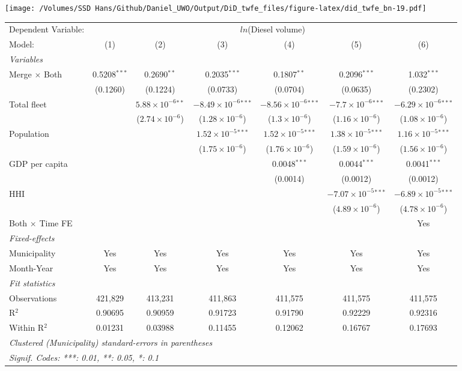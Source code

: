\documentclass[
]{article}
\begin{document}
\texttt{[image: /Volumes/SSD Hans/Github/Daniel\_UWO/Output/DiD\_twfe\_files/figure-latex/did\_twfe\_bn-19.pdf]}

\begin{tabular}{lcccccc}
\tabularnewline\midrule\midrule
Dependent Variable:&\multicolumn{6}{c}{$ln$(Diesel volume)}\\
Model:&(1) & (2) & (3) & (4) & (5) & (6)\\
\midrule \emph{Variables}&   &   &   &   &   &  \\
Merge $\times $ Both & 0.5208$^{***}$ & 0.2690$^{**}$ & 0.2035$^{***}$ & 0.1807$^{**}$ & 0.2096$^{***}$ & 1.032$^{***}$\\
  &(0.1260) & (0.1224) & (0.0733) & (0.0704) & (0.0635) & (0.2302)\\
Total fleet &    & $5.88\times 10^{-6}$$^{**}$ & $-8.49\times 10^{-6}$$^{***}$ & $-8.56\times 10^{-6}$$^{***}$ & $-7.7\times 10^{-6}$$^{***}$ & $-6.29\times 10^{-6}$$^{***}$\\
  &   & ($2.74\times 10^{-6}$) & ($1.28\times 10^{-6}$) & ($1.3\times 10^{-6}$) & ($1.16\times 10^{-6}$) & ($1.08\times 10^{-6}$)\\
Population &    &    & $1.52\times 10^{-5}$$^{***}$ & $1.52\times 10^{-5}$$^{***}$ & $1.38\times 10^{-5}$$^{***}$ & $1.16\times 10^{-5}$$^{***}$\\
  &   &    & ($1.75\times 10^{-6}$) & ($1.76\times 10^{-6}$) & ($1.59\times 10^{-6}$) & ($1.56\times 10^{-6}$)\\
GDP per capita &    &    &    & 0.0048$^{***}$ & 0.0044$^{***}$ & 0.0041$^{***}$\\
  &   &    &    & (0.0014) & (0.0012) & (0.0012)\\
HHI &    &    &    &    & $-7.07\times 10^{-5}$$^{***}$ & $-6.89\times 10^{-5}$$^{***}$\\
  &   &    &    &    & ($4.89\times 10^{-6}$) & ($4.78\times 10^{-6}$)\\
Both $\times$ Time FE &  &  &  &  &  & Yes\\
\midrule \emph{Fixed-effects}&   &   &   &   &   &  \\
Municipality & Yes & Yes & Yes & Yes & Yes & Yes\\
Month-Year & Yes & Yes & Yes & Yes & Yes & Yes\\
\midrule \emph{Fit statistics}&  & & & & & \\
Observations & 421,829&413,231&411,863&411,575&411,575&411,575\\
R$^2$ & 0.90695&0.90959&0.91723&0.91790&0.92229&0.92316\\
Within R$^2$ & 0.01231&0.03988&0.11455&0.12062&0.16767&0.17693\\
\midrule\midrule\multicolumn{7}{l}{\emph{Clustered (Municipality) standard-errors in parentheses}}\\
\multicolumn{7}{l}{\emph{Signif. Codes: ***: 0.01, **: 0.05, *: 0.1}}\\
\end{tabular}
\end{document}
